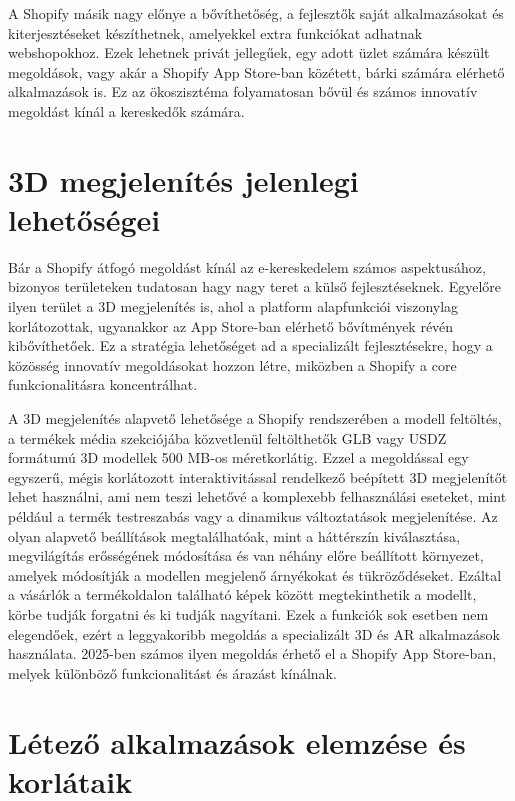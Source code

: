 \documentclass[12pt]{report}
\begin{document}
        A Shopify másik nagy előnye a bővíthetőség, a fejlesztők saját alkalmazásokat és kiterjesztéseket készíthetnek, amelyekkel extra funkciókat adhatnak webshopokhoz. Ezek lehetnek privát jellegűek, egy adott üzlet számára készült megoldások, vagy akár a Shopify App Store-ban közétett, bárki számára elérhető alkalmazások is. Ez az ökoszisztéma folyamatosan bővül és számos innovatív megoldást kínál a kereskedők számára.

        \section{3D megjelenítés jelenlegi lehetőségei}

        Bár a Shopify átfogó megoldást kínál az e-kereskedelem számos aspektusához, bizonyos területeken tudatosan hagy nagy teret a külső fejlesztéseknek. Egyelőre ilyen terület a 3D megjelenítés is, ahol a platform alapfunkciói viszonylag korlátozottak, ugyanakkor az App Store-ban elérhető bővítmények révén kibővíthetőek. Ez a stratégia lehetőséget ad a specializált fejlesztésekre, hogy a közösség innovatív megoldásokat hozzon létre, miközben a Shopify a core funkcionalitásra koncentrálhat.
        
        A 3D megjelenítés alapvető lehetősége a Shopify rendszerében a modell feltöltés, a termékek média szekciójába közvetlenül feltölthetők GLB vagy USDZ formátumú 3D modellek 500 MB-os méretkorlátig. Ezzel a megoldással egy egyszerű, mégis korlátozott interaktivitással rendelkező beépített 3D megjelenítőt lehet használni, ami nem teszi lehetővé a komplexebb felhasználási eseteket, mint például a termék testreszabás vagy a dinamikus változtatások megjelenítése. Az olyan alapvető beállítások megtalálhatóak, mint a háttérszín kiválasztása, megvilágítás erősségének módosítása és van néhány előre beállított környezet, amelyek módosítják a modellen megjelenő árnyékokat és tükröződéseket. Ezáltal a vásárlók a termékoldalon található képek között megtekinthetik a modellt, körbe tudják forgatni és ki tudják nagyítani. Ezek a funkciók sok esetben nem elegendőek, ezért a leggyakoribb megoldás a specializált 3D és AR alkalmazások használata. 2025-ben számos ilyen megoldás érhető el a Shopify App Store-ban, melyek különböző funkcionalitást és árazást kínálnak.
        
        \section{Létező alkalmazások elemzése és korlátaik}
\end{document}
